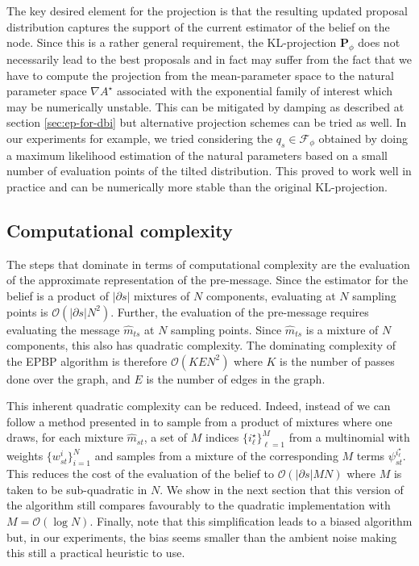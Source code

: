 The key desired element for the projection is that the resulting updated proposal distribution captures the support of the current estimator of the belief on the node. Since this is a rather general requirement, the KL-projection $\mathbf P_{\phi}$ does not necessarily lead to the best proposals and in fact may suffer from the fact that we have to compute the projection from the mean-parameter space to the natural parameter space $\nabla A^{\star}$ associated with the exponential family of interest which may be numerically unstable.  
This can be mitigated by damping as described at section \ref{sec:ep-for-dbi} but alternative projection schemes can be tried as well.
In our experiments for example, we tried considering the $q_{s}\in\mathcal F_{\phi}$ obtained by doing a maximum likelihood estimation of the natural parameters based on a small number of evaluation points of the tilted distribution. This proved to work well in practice and can be numerically more stable than the original KL-projection.

\subsection{\label{sec:EPBP-compcompl}Computational complexity}
The steps that dominate in terms of computational complexity are the evaluation of the approximate representation of the pre-message.
Since the estimator for the belief is a product of $|\partial s|$ mixtures of $N$ components, evaluating at $N$ sampling points is $\mathcal O(|\partial s|N^{2})$. 
Further, the evaluation of the pre-message requires evaluating the message $\widehat m_{ts}$ at $N$ sampling points. Since $\widehat m_{ts}$ is a mixture of $N$ components, this also has quadratic complexity. The dominating complexity of the EPBP algorithm is therefore $\mathcal O(KEN^{2})$ where $K$ is the number of passes done over the graph, and $E$ is the number of edges in the graph.

This inherent quadratic complexity can be reduced. Indeed, instead of we can follow a method presented in \cite{briers05} to sample from a product of mixtures where one draws, for each mixture $\widehat m_{st}$, a set of $M$ indices $\{i^{\star}_{\ell}\}_{\ell=1}^{M}$ from a multinomial with weights $\{w^{i}_{st}\}_{i=1}^{N}$ and samples from a mixture of the corresponding $M$ terms $\psi^{i^{\star}_{\ell}}_{st}$. 
This reduces the cost of the evaluation of the belief to $\mathcal O(|\partial {s}|MN)$ where $M$ is taken to be sub-quadratic in $N$. 
We show in the next section that this version of the algorithm still compares favourably to the quadratic implementation with $M = \mathcal O(\log N)$.
Finally, note that this simplification leads to a biased algorithm but, in our experiments, the bias seems smaller than the ambient noise making this still a practical heuristic to use. 



